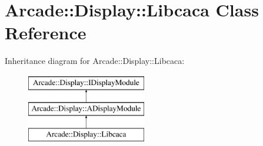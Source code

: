 \hypertarget{classArcade_1_1Display_1_1Libcaca}{}\section{Arcade\+::Display\+::Libcaca Class Reference}
\label{classArcade_1_1Display_1_1Libcaca}
Inheritance diagram for Arcade\+::Display\+::Libcaca\+:\begin{figure}[H]
\begin{center}
\leavevmode
\includegraphics[height=3.000000cm]{classArcade_1_1Display_1_1Libcaca}
\end{center}
\end{figure}

